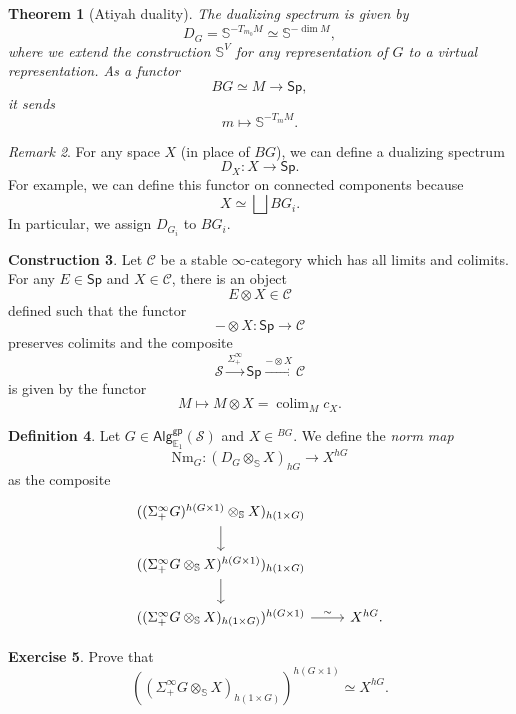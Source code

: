 \documentclass[10pt, oneside]{memoir}
\newtheorem{thm}{Theorem}[subsection]
\theoremstyle{definition}
\newtheorem{defn}[thm]{Definition}
\newtheorem{con}[thm]{Construction}
\newtheorem{exer}[thm]{Exercise}
\theoremstyle{remark}
\newtheorem{rmk}[thm]{Remark}
\theoremstyle{plain}
\theoremstyle{definition}
\theoremstyle{remark}
\newcommand{\E}{\mathbb{E}}
\newcommand{\bS}{\mathbb{S}}
\newcommand{\mc}[1]{\mathcal{#1}}
\newcommand{\mr}[1]{\mathrm{#1}}
\newcommand{\ms}[1]{\mathsf{#1}}
\newcommand{\1}{\mathbf{1}}
\newcommand{\2}{\mathbf{2}}
\newcommand{\3}{\mathbf{3}}
\DeclareMathOperator*{\colim}{colim}
\begin{document}
\begin{thm}[Atiyah duality]
    The dualizing spectrum is given by
    \[ D_G = \bS^{-T_{m_0} M} \simeq \bS^{-\dim M}, \]
    where we extend the construction \(\bS^V \) for any representation of \(G \) to a virtual representation. As a functor
    \[ BG \simeq M \to \ms{Sp}, \]
    it sends 
    \[ m \mapsto \bS^{-T_m M}. \]
\end{thm}

\begin{rmk}
    For any space \(X \) (in place of \(BG \)), we can define a dualizing spectrum
    \[ D_X \colon X \to \ms{Sp}. \]
    For example, we can define this functor on connected components because
    \[ X \simeq \bigsqcup B G_i. \]
    In particular, we assign \(D_{G_i} \) to \(BG_i \).
\end{rmk}

\begin{con}
    Let \(\mc{C} \) be a stable \(\infty \)-category which has all limits and colimits. For any \(E \in \ms{Sp} \) and \(X \in \mc{C} \), there is an object
    \[ E \otimes X \in \mc{C} \]
    defined such that the functor
    \[ - \otimes X \colon \ms{Sp} \to \mc{C} \]
    preserves colimits and the composite
    \[ \mc{S} \xrightarrow{\Sigma_+^{\infty}} \ms{Sp} \xrightarrow{- \otimes X} \mc{C} \]
    is given by the functor
    \[ M \mapsto M \otimes X = \colim_M c_X. \]
\end{con}

\begin{defn}
    Let \(G \in \ms{Alg}_{\E_1}^{\ms{gp}} (\mc{S}) \) and \(X \in \mc{}^{BG} \). We define the \textit{norm map}
    \[ \mr{Nm}_G \colon (D_G \otimes_{\bS} X)_{hG} \to X^{hG} \]
    as the composite
    \begin{equation*}
    \begin{tikzcd}
        ((\Sigma_+^{\infty} G)^{h(G\times 1)} \otimes_{\bS} X)_{h(1 \times G)} \ar{d} \\
        ((\Sigma_+^{\infty} G \otimes_{\bS} X)^{h(G \times 1)})_{h(1 \times G)} \ar{d} \\
        ((\Sigma_+^{\infty} G \otimes_{\bS} X)_{h(1 \times G)})^{h(G \times 1)} \ar{r}{\sim} & X^{hG}.
    \end{tikzcd}
    \end{equation*}
\end{defn}

\begin{exer}
    Prove that
    \[ ((\Sigma_+^{\infty} G \otimes_{\bS} X)_{h(1 \times G)})^{h(G \times 1)} \simeq X^{hG}. \]
\end{exer}
\end{document}
